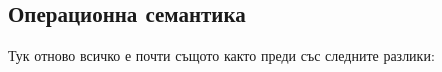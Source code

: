 

\subsection{Операционна семантика}


Тук отново всичко е почти същото както преди със следните разлики:

\begin{figure}[H]






\end{figure}
